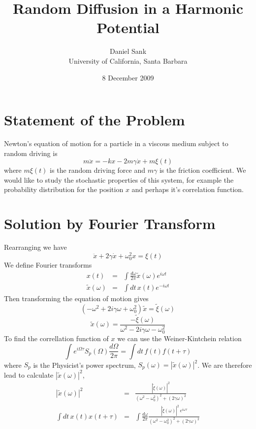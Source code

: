 \documentclass{article}
\title{Random Diffusion in a Harmonic Potential}
\author{Daniel Sank \\ \small{University of California, Santa Barbara}}
\date{8 December 2009}
\begin{document}
\maketitle

\section{Statement of the Problem}

Newton's equation of motion for a particle in a viscous medium subject
to random driving is\[
m\ddot{x}=-kx-2m\gamma\dot{x}+m\xi(t)\]
where $m\xi(t)$ is the random driving force and $m\gamma$ is the
friction coefficient. We would like to study the stochastic properties
of this system, for example the probability distribution for the position
$x$ and perhaps it's correlation function.


\section{Solution by Fourier Transform}

Rearranging we have\[
\ddot{x}+2\gamma\dot{x}+\omega_{0}^{2}x=\xi(t)\]
We define Fourier transforms\begin{eqnarray*}
x(t) & = & \int\frac{d\omega}{2\pi}\tilde{x}(\omega)e^{i\omega t}\\
\tilde{x}(\omega) & = & \int dt\, x(t)e^{-i\omega t}\end{eqnarray*}
Then transforming the equation of motion gives\[
(-\omega^{2}+2i\gamma\omega+\omega_{0}^{2})\tilde{x}=\tilde{\xi}(\omega)\]
\[
\tilde{x}(\omega)=\frac{-\tilde{\xi}(\omega)}{\omega^{2}-2i\gamma\omega-\omega_{0}^{2}}\]
To find the correllation function of $x$ we can use the Weiner-Kintchein
relation\[
\int e^{i\Omega\tau}S_{p}(\Omega)\frac{d\Omega}{2\pi}=\int dt\, f(t)f(t+\tau)\]
where $S_{p}$ is the Physicist's power spectrum, $S_{p}(\omega)=|\tilde{x}(\omega)|^{2}$.
We are therefore lead to calculate $|\tilde{x}(\omega)|^{2}$,\begin{eqnarray*}
|\tilde{x}(\omega)|^{2} & = & \frac{|\tilde{\xi}(\omega)|^{2}}{(\omega^{2}-\omega_{0}^{2})^{2}+(2\gamma\omega)^{2}}\\
\int dt\, x(t)x(t+\tau) & = & \int\frac{d\omega}{2\pi}\frac{|\tilde{\xi}(\omega)|^{2}\, e^{i\omega\tau}}{(\omega^{2}-\omega_{0}^{2})^{2}+(2\gamma\omega)^{2}}\end{eqnarray*}
\end{document}
